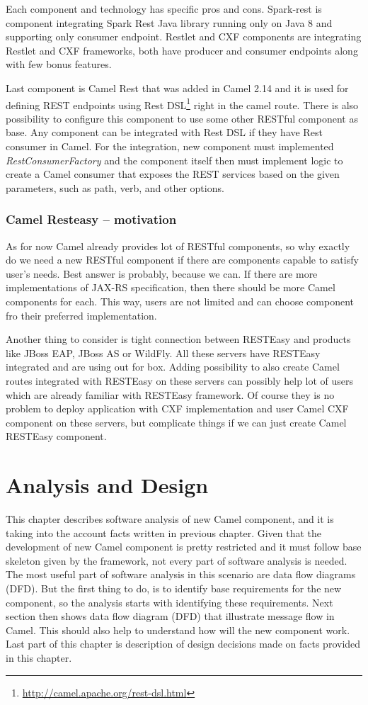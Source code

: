 \documentclass[12pt,final,oneside]{fithesis2}
\begin{document}
Each component and technology has specific pros and cons. Spark-rest is component integrating Spark Rest Java library running only on Java 8 and supporting only consumer endpoint. Restlet and CXF components are integrating Restlet and CXF frameworks, both have producer and consumer endpoints along with few bonus features. 

Last component is Camel Rest that was added in Camel 2.14 and it is used for defining REST endpoints using Rest DSL\footnote{\url{http://camel.apache.org/rest-dsl.html}} right in the camel route. There is also possibility to configure this component to use some other RESTful component as base. Any component can be integrated with Rest DSL if they have Rest consumer in Camel. For the integration, new component must implemented \textit{RestConsumerFactory} and the component itself then must implement logic to create a Camel consumer that exposes the REST services based on the given parameters, such as path, verb, and other options.

\subsection{Camel Resteasy -- motivation}
As for now Camel already provides lot of RESTful components, so why exactly do we need a new RESTful component if there are components capable to satisfy user's needs. Best answer is probably, because we can. If there are more implementations of JAX-RS specification, then there should be more Camel components for each. This way, users are not limited and can choose component fro their preferred implementation. 

Another thing to consider is tight connection between RESTEasy and products like JBoss EAP, JBoss AS or WildFly. All these servers have RESTEasy integrated and are using out for box. Adding possibility to also create Camel routes integrated with RESTEasy on these servers can possibly help lot of users which are already familiar with RESTEasy framework. Of course they is no problem to deploy application with CXF implementation and user Camel CXF component on these servers, but complicate things if we can just create Camel RESTEasy component. 

%
\chapter{Analysis and Design}
This chapter describes software analysis of new Camel component, and it is taking into the account facts written in previous chapter. Given that the development of new Camel component is pretty restricted and it must follow base skeleton given by the framework, not every part of software analysis is needed. The most useful part of software analysis in this scenario are data flow diagrams (DFD). But the first thing to do, is to identify base requirements for the new component, so the analysis starts with identifying these requirements. Next section then shows data flow diagram (DFD) that illustrate message flow in Camel. This should also help to understand how will the new component work. Last part of this chapter is description of design decisions made on facts provided in this chapter. 
\end{document}
